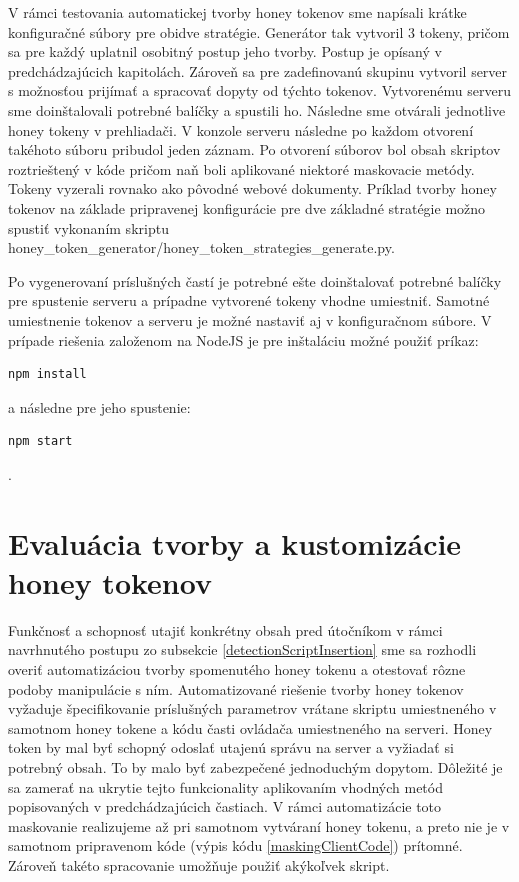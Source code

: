\documentclass[conference, 11pt,slovak,a4paper,twoside]{IEEEtran}
\begin{document}
V rámci testovania automatickej tvorby honey tokenov sme napísali krátke konfiguračné súbory pre obidve stratégie. Generátor tak vytvoril 3 tokeny, pričom sa pre každý uplatnil osobitný postup jeho tvorby. Postup je opísaný v predchádzajúcich kapitolách. Zároveň sa pre zadefinovanú skupinu vytvoril server s možnosťou prijímať a spracovať dopyty od týchto tokenov. Vytvorenému serveru sme doinštalovali potrebné balíčky a spustili ho. Následne sme otvárali jednotlive honey tokeny v prehliadači. V konzole serveru následne po každom otvorení takéhoto súboru pribudol jeden záznam. Po otvorení súborov bol obsah skriptov roztrieštený v kóde pričom naň boli aplikované niektoré maskovacie metódy. Tokeny vyzerali rovnako ako pôvodné webové dokumenty. Príklad tvorby honey tokenov na základe pripravenej konfigurácie pre dve základné stratégie možno spustiť vykonaním skriptu honey\_token\_generator/honey\_token\_strategies\_generate.py. 

Po vygenerovaní príslušných častí je potrebné ešte doinštalovať potrebné balíčky pre spustenie serveru a prípadne vytvorené tokeny vhodne umiestniť. Samotné umiestnenie tokenov a serveru je možné nastaviť aj v konfiguračnom súbore. V prípade riešenia založenom na NodeJS je pre inštaláciu možné použiť príkaz:

\begin{lstlisting}
npm install
\end{lstlisting} 

a následne pre jeho spustenie:

\begin{lstlisting}
npm start
\end{lstlisting}.  



\section{Evaluácia tvorby a kustomizácie honey tokenov} \label{evaluationOfHoneyTokenCustomizations}

Funkčnosť a schopnosť utajiť konkrétny obsah pred útočníkom v rámci navrhnutého postupu zo subsekcie \ref{detectionScriptInsertion} sme sa rozhodli overiť automatizáciou tvorby spomenutého honey tokenu a otestovať rôzne podoby manipulácie s ním. Automatizované riešenie tvorby honey tokenov vyžaduje špecifikovanie príslušných parametrov vrátane skriptu umiestneného v samotnom honey tokene a kódu časti ovládača umiestneného na serveri. Honey token by mal byť schopný odoslať utajenú správu na server a vyžiadať si potrebný obsah. To by malo byť zabezpečené jednoduchým dopytom. Dôležité je sa zamerať na ukrytie tejto funkcionality aplikovaním vhodných metód popisovaných v predchádzajúcich častiach. V rámci automatizácie toto maskovanie realizujeme až pri samotnom vytváraní honey tokenu, a preto nie je v samotnom pripravenom kóde (výpis kódu \ref{maskingClientCode}) prítomné. Zároveň takéto spracovanie umožňuje použiť akýkoľvek skript.
\end{document}
